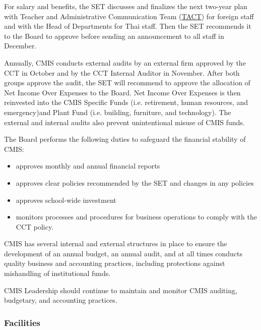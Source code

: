 \begin{findings}
For salary and benefits, the SET discusses and finalizes the next two-year plan with Teacher and Administrative  Communication Team (\href{https://docs.google.com/document/d/14nhwcw8xo3i-23Q-WUxo6KJ_c8yFKu-jTdCctt4MFcs/edit}{TACT}) for foreign staff and with the Head of Departments for Thai staff. Then the SET recommends it to the Board to approve before sending an announcement to all staff in December.


Annually, CMIS conducts external audits by an external firm approved by the CCT in October and by the CCT Internal Auditor in November. After both groups approve the audit, the SET will recommend to approve the allocation of Net Income Over Expenses to the Board. Net Income Over Expenses is then reinvested into the CMIS Specific Funds (i.e. retirement, human resources, and emergency)and Plant Fund (i.e. building, furniture, and technology). The external and internal audits also prevent unintentional misuse of CMIS funds. 


The Board performs the following duties to safeguard the financial stability of CMIS:
\begin{itemize}
\item approves monthly and annual financial reports 
\item approves clear policies recommended by the SET and changes in any policies
\item approves school-wide investment
\item monitors processes and procedures for business operations to comply with the CCT policy.
\end{itemize}


CMIS has several internal and external structures in place to ensure the development of an annual budget, an annual audit, and at all times conducts quality business and accounting practices, including protections against mishandling of institutional funds.

CMIS Leadership should continue to maintain and monitor CMIS auditing, budgetary, and accounting practices. 
\end{findings}

\subsubsection{Facilities}

